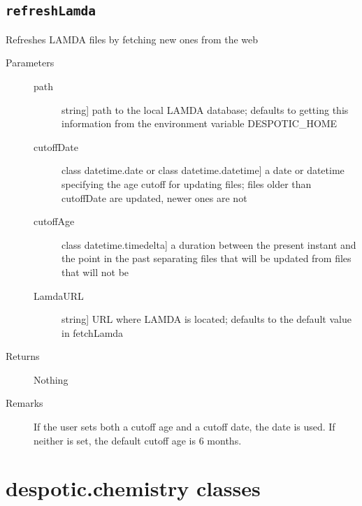 \documentclass[letterpaper,10pt,english]{sphinxmanual}
\begin{document}
\subsection{\texttt{refreshLamda}}
\label{fulldoc:refreshlamda}\label{fulldoc:sssec-full-refreshlamda}

\begin{fulllineitems}
\label{fulldoc:despotic.refreshLamda}
Refreshes LAMDA files by fetching new ones from the web
\begin{description}
\item[{Parameters}] \leavevmode\begin{description}
\item[{path}] \leavevmode{[}string{]}
path to the local LAMDA database; defaults to getting this
information from the environment variable DESPOTIC\_HOME

\item[{cutoffDate}] \leavevmode{[}class datetime.date or class datetime.datetime{]}
a date or datetime specifying the age cutoff for updating
files; files older than cutoffDate are updated, newer ones are
not

\item[{cutoffAge}] \leavevmode{[}class datetime.timedelta{]}
a duration between the present instant and the point in the
past separating files that will be updated from files that
will not be

\item[{LamdaURL}] \leavevmode{[}string{]}
URL where LAMDA is located; defaults to the default value in
fetchLamda

\end{description}

\item[{Returns}] \leavevmode
Nothing

\item[{Remarks}] \leavevmode
If the user sets both a cutoff age and a cutoff date, the date is
used. If neither is set, the default cutoff age is 6 months.

\end{description}

\end{fulllineitems}



\section{despotic.chemistry classes}
\label{fulldoc:despotic-chemistry-classes}
\end{document}
